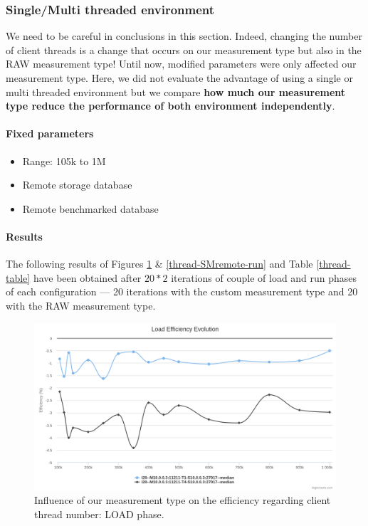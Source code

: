 \documentclass[a4paper,11pt]{report}
\begin{document}
\clearpage

\subsubsection{Single/Multi threaded environment}

We need to be careful in conclusions in this section. Indeed, changing the number of client threads is a change that occurs on our measurement type but also in the RAW measurement type! Until now, modified parameters were only affected our measurement type. Here, we did not evaluate the advantage of using a single or multi threaded environment but we compare \textbf{how much our measurement type reduce the performance of both environment independently}.


\paragraph{Fixed parameters}
\begin{itemize}
\item
Range: 105k to 1M
\item
Remote storage database
\item
Remote benchmarked database
\end{itemize}


\paragraph{Results}

The following results of Figures \ref{thread-SMremote-load}  \& \ref{thread-SMremote-run} and Table \ref{thread-table} have been obtained after $20*2$ iterations of couple of load and run phases of each configuration --- 20 iterations with the custom measurement type and 20 with the RAW measurement type.

\begin{figure}[ht]
\begin{center}
\includegraphics[width=1\linewidth]{images/evaluation/thread-SMremote-load.png}
\caption{Influence of our measurement type on the efficiency regarding client thread number: LOAD phase.}
\label{thread-SMremote-load}
\end{center}
\end{figure}
\end{document}
